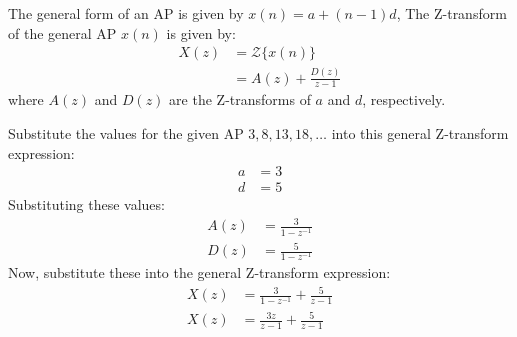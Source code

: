 \documentclass[12pt]{article}
\newcommand{\initialterm}{3}
\newcommand{\commondifference}{5}
\begin{document}
The general form of an AP is given by \(x(n) = a + (n-1)d\),
The Z-transform of the general AP \(x(n)\) is given by:
\begin{align*}
X(z) &= \mathcal{Z}\{x(n)\} \\
&= A(z) + \frac{D(z)}{z-1}
\end{align*}
where \(A(z)\) and \(D(z)\) are the Z-transforms of \(a\) and  \(d\), respectively.

Substitute the values for the given AP \(3, 8, 13, 18, \ldots\) into this general Z-transform expression:
\begin{align*}
a &= \initialterm \\
d &= \commondifference
\end{align*}
Substituting these values:
\begin{align*}
A(z) &= \frac{\initialterm}{1 - z^{-1}} \\
D(z) &= \frac{\commondifference}{1 - z^{-1}}
\end{align*}
Now, substitute these into the general Z-transform expression:
\begin{align*}
X(z) &= \frac{\initialterm}{1 - z^{-1}} + \frac{\commondifference}{z-1} \\
X(z) &= \frac{\initialterm z}{z-1} + \frac{\commondifference}{z-1}
\end{align*}
\end{document}
